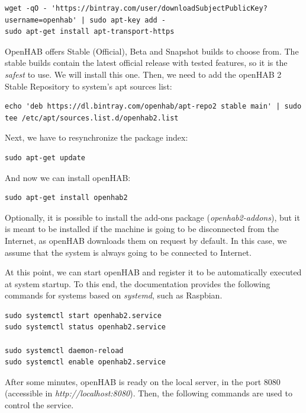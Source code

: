 \begin{lstlisting}[style=Consola]
wget -qO - 'https://bintray.com/user/downloadSubjectPublicKey?username=openhab' | sudo apt-key add -
sudo apt-get install apt-transport-https
\end{lstlisting}

OpenHAB offers Stable (Official), Beta and Snapshot builds to choose from. The stable builds contain the latest official release
with tested features, so it is the \textit{safest} to use. We will install this one. Then, we need to add the openHAB 2 Stable Repository
to system's apt sources list:

\begin{lstlisting}[style=Consola]
echo 'deb https://dl.bintray.com/openhab/apt-repo2 stable main' | sudo tee /etc/apt/sources.list.d/openhab2.list
\end{lstlisting}

Next, we have to resynchronize the package index:

\begin{lstlisting}[style=Consola]
sudo apt-get update
\end{lstlisting}

And now we can install openHAB:

\begin{lstlisting}[style=Consola]
sudo apt-get install openhab2
\end{lstlisting}

Optionally, it is possible to install the add-ons package (\textit{openhab2-addons}), but it is meant to be installed if the machine
is going to be disconnected from the Internet, as openHAB downloads them on request by default. In this case, we assume that the
system is always going to be connected to Internet.

At this point, we can start openHAB and register it to be automatically executed at system startup. To this end, the documentation
provides the following commands for systems based on \textit{systemd}, such as Raspbian.

\begin{lstlisting}[style=Consola]
sudo systemctl start openhab2.service
sudo systemctl status openhab2.service

sudo systemctl daemon-reload
sudo systemctl enable openhab2.service
\end{lstlisting}

After some minutes, openHAB is ready on the local server, in the port 8080 (accessible in \textit{http://localhost:8080}). Then,
the following commands are used to control the service.

